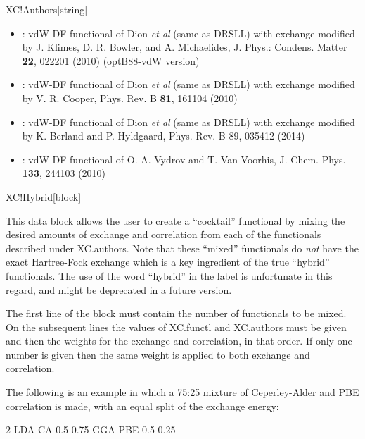 \begin{fdfentry}{XC!Authors}[string]
\begin{itemize}
    \item%
    : %
    vdW-DF functional of Dion \textit{et al} (same as DRSLL)
    with exchange modified by J. Klimes, D. R. Bowler, and A. Michaelides, 
    J. Phys.: Condens. Matter \textbf{22}, 022201 (2010) (optB88-vdW version)
    
    \item%
    : %
    vdW-DF functional of Dion \textit{et al} (same as DRSLL)
    with exchange modified by V. R. Cooper, Phys. Rev. B \textbf{81}, 161104 (2010)
    
    \item%
    : %
    vdW-DF functional of Dion \textit{et al} (same as DRSLL) 
    with exchange modified by 
    K. Berland and P. Hyldgaard, Phys. Rev. B 89, 035412 (2014)
    
    \item%
    : %
    vdW-DF functional of O. A. Vydrov and T. Van Voorhis, 
    J. Chem. Phys. \textbf{133}, 244103 (2010)
    
  \end{itemize}

\end{fdfentry}


\begin{fdfentry}{XC!Hybrid}[block]
  
  This data block allows the user to create a ``cocktail'' functional by
  mixing the desired amounts of exchange and correlation from each of
  the functionals described under XC.authors. Note that these ``mixed''
  functionals do \emph{not} have the exact Hartree-Fock exchange which
  is a key ingredient of the true ``hybrid'' functionals. The use of
  the word ``hybrid'' in the label is unfortunate in this regard, and
  might be deprecated in a future version.

  The first line of the block must contain the number of functionals to
  be mixed. On the subsequent lines the values of XC.functl and
  XC.authors must be given and then the weights for the exchange and
  correlation, in that order. If only one number is given then the same
  weight is applied to both exchange and correlation.

  The following is an example in which a 75:25 mixture of Ceperley-Alder
  and PBE correlation is made, with an equal split of the exchange
  energy:
  
  \begin{fdfexample}
        2
        LDA CA  0.5 0.75
        GGA PBE 0.5 0.25
  \end{fdfexample}

\end{fdfentry}

